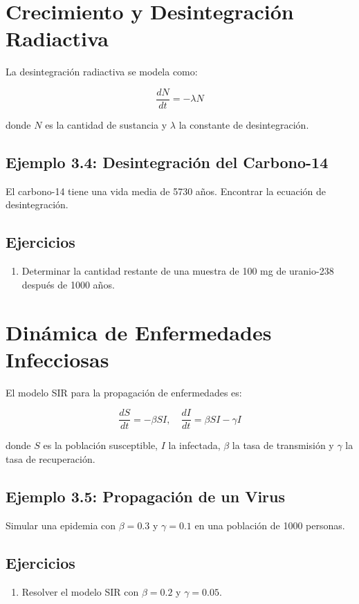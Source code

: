 \section{Crecimiento y Desintegración Radiactiva}
La desintegración radiactiva se modela como:

\begin{equation}
\frac{dN}{dt} = -\lambda N
\end{equation}

donde \( N \) es la cantidad de sustancia y \( \lambda \) la constante de desintegración.

\subsection*{Ejemplo 3.4: Desintegración del Carbono-14}
El carbono-14 tiene una vida media de 5730 años. Encontrar la ecuación de desintegración.

\subsection*{Ejercicios}
\begin{enumerate}
    \item Determinar la cantidad restante de una muestra de 100 mg de uranio-238 después de 1000 años.
\end{enumerate}

\section{Dinámica de Enfermedades Infecciosas}
El modelo SIR para la propagación de enfermedades es:

\begin{equation}
\frac{dS}{dt} = -\beta SI, \quad \frac{dI}{dt} = \beta SI - \gamma I
\end{equation}

donde \( S \) es la población susceptible, \( I \) la infectada, \( \beta \) la tasa de transmisión y \( \gamma \) la tasa de recuperación.

\subsection*{Ejemplo 3.5: Propagación de un Virus}
Simular una epidemia con \( \beta = 0.3 \) y \( \gamma = 0.1 \) en una población de 1000 personas.

\subsection*{Ejercicios}
\begin{enumerate}
    \item Resolver el modelo SIR con \( \beta = 0.2 \) y \( \gamma = 0.05 \).
\end{enumerate}

